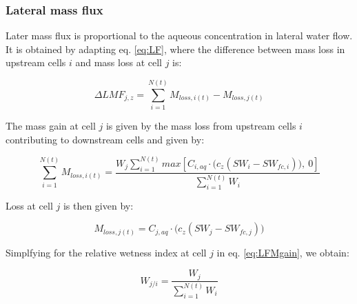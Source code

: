 \documentclass[]{article}
\begin{document}
\subsubsection{Lateral mass flux}\label{lateral-mass-flux}

Later mass flux is proportional to the aqueous concentration in lateral
water flow. It is obtained by adapting eq. \ref{eq:LF}, where the
difference between mass loss in upstream cells \(i\) and mass loss at
cell \(j\) is:

\begin{equation}
\Delta LMF_{j,z} = \sum^{N(t)}_{i=1} M_{loss, i(t)} - M_{loss,j(t)}
\label{eq:LMF}  
\end{equation}

The mass gain at cell \(j\) is given by the mass loss from upstream
cells \(i\) contributing to downstream cells and given by:

\begin{equation}
\sum^{N(t)}_{i=1} M_{loss, i(t)} = \frac{W_{j} \sum^{N(t)}_{i=1}max[ C_{i,aq}\cdot\Big(c_{z}(SW_{i}-SW_{fc,i})\Big),~0] }{ \sum^{N(t)}_{i=1} W_{i} }
\label{eq:LFMgain} 
\end{equation}

Loss at cell \(j\) is then given by:

\begin{equation}
M_{loss,j(t)} = C_{j,aq}\cdot\Big(c_{z}(SW_{j}-SW_{fc,j})\Big)
\end{equation}

Simplfying for the relative wetness index at cell \(j\) in eq.
\ref{eq:LFMgain}, we obtain:

\begin{equation}
W_{j/i} = \frac{W_{j}}{\sum^{N(t)}_{i=1} W_{i} } 
\end{equation}
\end{document}

